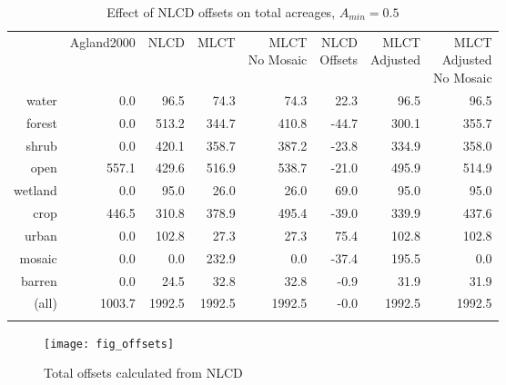 \begin{table}[ht]
\begin{center}
{\small
\begin{tabular}{rrrrrrrr}
  \hline
 & Agland2000 & NLCD & MLCT & \pbox[c][][c]{3in}{MLCT\\No Mosaic} & \pbox[c][][c]{3in}{NLCD\\Offsets} & \pbox[c][][c]{3in}{MLCT\\Adjusted} & \pbox[c][][c]{3in}{\smallskip{}MLCT\\Adjusted\\No Mosaic} \\ 
  \noalign{\smallskip} \hline
water & 0.0 & 96.5 & 74.3 & 74.3 & 22.3 & 96.5 & 96.5 \\ 
  forest & 0.0 & 513.2 & 344.7 & 410.8 & -44.7 & 300.1 & 355.7 \\ 
  shrub & 0.0 & 420.1 & 358.7 & 387.2 & -23.8 & 334.9 & 358.0 \\ 
  open & 557.1 & 429.6 & 516.9 & 538.7 & -21.0 & 495.9 & 514.9 \\ 
  wetland & 0.0 & 95.0 & 26.0 & 26.0 & 69.0 & 95.0 & 95.0 \\ 
  crop & 446.5 & 310.8 & 378.9 & 495.4 & -39.0 & 339.9 & 437.6 \\ 
  urban & 0.0 & 102.8 & 27.3 & 27.3 & 75.4 & 102.8 & 102.8 \\ 
  mosaic & 0.0 & 0.0 & 232.9 & 0.0 & -37.4 & 195.5 & 0.0 \\ 
  barren & 0.0 & 24.5 & 32.8 & 32.8 & -0.9 & 31.9 & 31.9 \\ 
  (all) & 1003.7 & 1992.5 & 1992.5 & 1992.5 & -0.0 & 1992.5 & 1992.5 \\ 
   \noalign{\smallskip} \hline
\end{tabular}
}
\caption{Effect of NLCD offsets on total acreages, $A_{min}=0.5$}
\label{tab:areas2}
\end{center}
\end{table}

\begin{figure}[hpt]
  \centering


  \texttt{[image: fig\_offsets]}
  \caption{Total offsets calculated from NLCD}
  \label{fig:offsets}
\end{figure}



